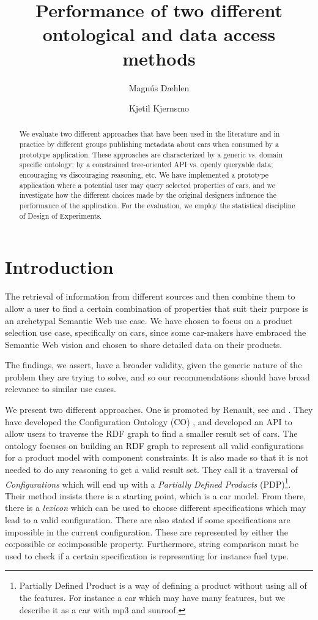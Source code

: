\documentclass{llncs}
\title{Performance of two different ontological and data access methods}
\author{Magn\'{u}s D\ae hlen \and Kjetil Kjernsmo}
\institute{Department of Informatics,
Postboks 1080 Blindern,
N-0316 Oslo, Norway \email{\{magnudae,kjekje\}@ifi.uio.no} }
\begin{document}
\maketitle

\begin{abstract}
  We evaluate two different approaches that have been used in the
  literature and in practice by different groups publishing metadata
  about cars when consumed by a prototype application. These
  approaches are characterized by a generic vs. domain specific
  ontology; by a constrained tree-oriented API vs. openly queryable
  data; encouraging vs discouraging reasoning, etc.  We have
  implemented a prototype application where a potential user may query
  selected properties of cars, and we investigate how the different
  choices made by the original designers influence the performance of
  the application. For the evaluation, we employ the statistical
  discipline of Design of Experiments.

\end{abstract}

\section{Introduction}

The retrieval of information from different sources and then combine
them to allow a user to find a certain combination of properties that
suit their purpose is an archetypal Semantic Web use case. We have
chosen to focus on a product selection use case, specifically on cars,
since some car-makers have embraced the Semantic Web vision and chosen
to share detailed data on their products.

The findings, we assert, have a broader validity, given the generic
nature of the problem they are trying to solve, and so our
recommendations should have broad relevance to similar use cases.

We present two different approaches. One is promoted by Renault, see
\cite{SemWebAppRes} and \cite{ren1}. They have developed the
Configuration Ontology (CO) \cite{confOnt}, and developed an API to allow
users to traverse the RDF graph to find a smaller result set of cars.
The ontology focuses on building an RDF graph to represent all valid
configurations for a product model with component constraints.  It is
also made so that it is not needed to do any reasoning to get a valid
result set.  They call it a traversal of \emph{Configurations} which
will end up with a \emph{Partially Defined Products}
(PDP)\footnote{Partially Defined Product is a way of defining a
  product without using all of the features. For instance a car which
  may have many features, but we describe it as a car with mp3 and
  sunroof.}.  Their method insists there is a starting point, which is
a car model. From there, there is a \emph{lexicon} which can be used
to choose different specifications which may lead to a valid
configuration. There are also stated if some specifications are
impossible in the current configuration.  These are represented by
either the \textsf{co:possible} or \textsf{co:impossible}
property. Furthermore, string comparison must be used to check if a
certain specification is representing for instance fuel type.
\end{document}
